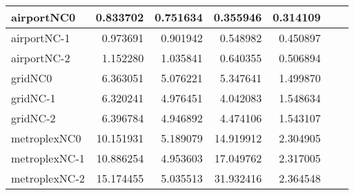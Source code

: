 \begin{longtable}{|l|r|r|r|r|r|r|}
airportNC0 & 0.833702 & 0.751634 & 0.355946 & 0.314109 \\ \hline
airportNC-1 & 0.973691 & 0.901942 & 0.548982 & 0.450897 \\ \hline
airportNC-2 & 1.152280 & 1.035841 & 0.640355 & 0.506894 \\ \hline
gridNC0 & 6.363051 & 5.076221 & 5.347641 & 1.499870 \\ \hline
gridNC-1 & 6.320241 & 4.976451 & 4.042083 & 1.548634 \\ \hline
gridNC-2 & 6.396784 & 4.946892 & 4.474106 & 1.543107 \\ \hline
metroplexNC0 & 10.151931 & 5.189079 & 14.919912 & 2.304905 \\ \hline
metroplexNC-1 & 10.886254 & 4.953603 & 17.049762 & 2.317005 \\ \hline
metroplexNC-2 & 15.174455 & 5.035513 & 31.932416 & 2.364548 \\ \hline
\end{longtable}
